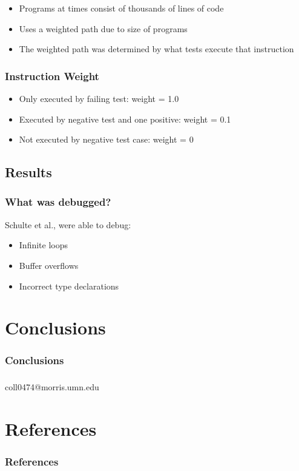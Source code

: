 \documentclass{beamer}
\newcommand{\linespace}{\vskip 0.25cm}
\begin{document}
\begin{frame}
\begin{itemize}
   \item Programs at times consist of thousands of lines of code  
   \item Uses a weighted path due to size of programs
   \item The weighted path was determined by what tests execute that instruction
\end{itemize}
\end{frame}


\begin{frame}
  \frametitle{Instruction Weight}
  
    \begin{itemize}
  	\item Only executed by failing test: weight = 1.0
  	\item Executed by negative test and one positive: weight = 0.1
  	\item Not executed by negative test case: weight = 0
  \end{itemize}
\end{frame}

\subsection[Results]{Results}

\begin{frame}
\frametitle{What was debugged?}
Schulte et al., were able to debug:
\begin{itemize}
\item Infinite loops
\item Buffer overflows
\item Incorrect type declarations

\end{itemize}


\end{frame}




\section[Conclusions]{Conclusions}

\begin{frame}
\frametitle{Conclusions}


\end{frame}


\begin{frame}
\frametitle{}
{
\cite{FINCH:2011}
\cite{Assembly:2010}
}
\begin{center}
coll0474@morris.umn.edu
\\
\linespace
\linespace
{}
\end{center}

\end{frame}




\section*{References}

\begin{frame} 
	\frametitle{References} 
	
	
\end{frame} 
\end{document}
